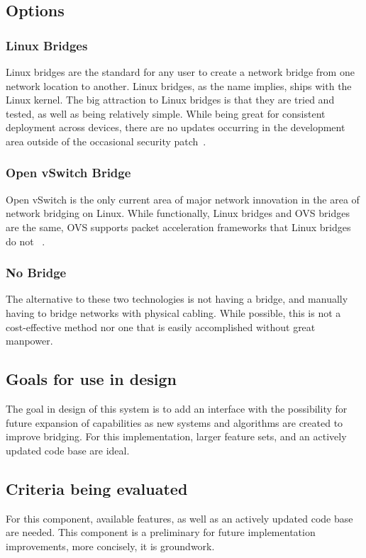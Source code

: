 \documentclass[10pt,letterpaper,onecolumn,journal]{IEEEtran}
\begin{document}
\subsection{Options}

\subsubsection{Linux Bridges}
Linux bridges are the standard for any user to create a network bridge from
one network location to another. Linux bridges, as the name implies, ships with
the Linux kernel. The big attraction to Linux bridges is that they are tried and
tested, as well as being relatively simple. While being great for consistent
deployment across devices, there are no updates occurring in the development
area outside of the occasional security patch~\cite{ovs-linuxbridge}.

\subsubsection{Open vSwitch Bridge}
Open vSwitch is the only current area of major network innovation in the area of
network bridging on Linux. While functionally, Linux bridges and OVS bridges are
the same, OVS supports packet acceleration frameworks that Linux bridges do not
~\cite{ovs-linuxbridge}.

\subsubsection{No Bridge}
The alternative to these two technologies is not having a bridge, and manually
having to bridge networks with physical cabling. While possible, this is not a
cost-effective method nor one that is easily accomplished without great
manpower.

\subsection{Goals for use in design}
The goal in design of this system is to add an interface with the possibility
for future expansion of capabilities as new systems and algorithms are created
to improve bridging. For this implementation, larger feature sets, and an
actively updated code base are ideal.

\subsection{Criteria being evaluated}
For this component, available features, as well as an actively updated code base
are needed. This component is a preliminary for future implementation
improvements, more concisely, it is groundwork.
\end{document}
